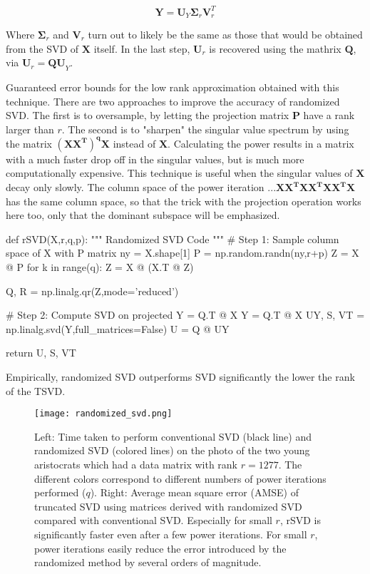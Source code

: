 \begin{equation}
\mathbf{Y} = \mathbf{U}_Y\mathbf{\Sigma}_r\mathbf{V}_r^T
\end{equation}

Where $\mathbf{\Sigma}_r$ and $\mathbf{V}_r$ turn out to likely be the same as those that would be obtained from the SVD of $\mathbf{X}$ itself. In the last step, $\mathbf{U}_r$ is recovered using the mathrix $\mathbf{Q}$, via $\mathbf{U}_r = \mathbf{QU}_Y$. 

Guaranteed error bounds for the low rank approximation obtained with this technique. There are two approaches to improve the accuracy of randomized SVD. The first is to oversample, by letting the projection matrix $\mathbf{P}$ have a rank larger than $r$. The second is to "sharpen" the singular value spectrum by using the matrix $\mathbf{(X X^T)^q X }$ instead of $\mathbf{X}$. Calculating the power results in a matrix with a much faster drop off in the singular values, but is much more computationally expensive. This technique is useful when the singular values of $\mathbf{X}$ decay only slowly. The column space of the power iteration $\mathbf{...X X^T X X^T X X^T X}$ has the same column space, so that the trick with the projection operation works here too, only that the dominant subspace will be emphasized.\\


\begin{python}
def rSVD(X,r,q,p):
    """
    Randomized SVD Code
    """
    # Step 1: Sample column space of X with P matrix
    ny = X.shape[1]
    P = np.random.randn(ny,r+p)
    Z = X @ P
    for k in range(q):
        Z = X @ (X.T @ Z)

    Q, R = np.linalg.qr(Z,mode='reduced')

    # Step 2: Compute SVD on projected Y = Q.T @ X
    Y = Q.T @ X
    UY, S, VT = np.linalg.svd(Y,full_matrices=False)
    U = Q @ UY

    return U, S, VT
\end{python}

Empirically, randomized SVD outperforms SVD significantly the lower the rank of the TSVD.


\begin{figure}
\centering
    \texttt{[image: randomized\_svd.png]}
    \caption{Left: Time taken to perform conventional SVD (black line) and randomized SVD (colored lines) on the photo of the two young aristocrats which had a data matrix with rank $r=1277$. The different colors correspond to different numbers of power iterations performed ($q$). Right: Average mean square error (AMSE) of truncated SVD using matrices derived with randomized SVD compared with conventional SVD. Especially for small $r$, rSVD is significantly faster even after a few power iterations. For small $r$, power iterations easily reduce the error introduced by the randomized method by several orders of magnitude.}
    \label{fig:svd_scree}
\end{figure}